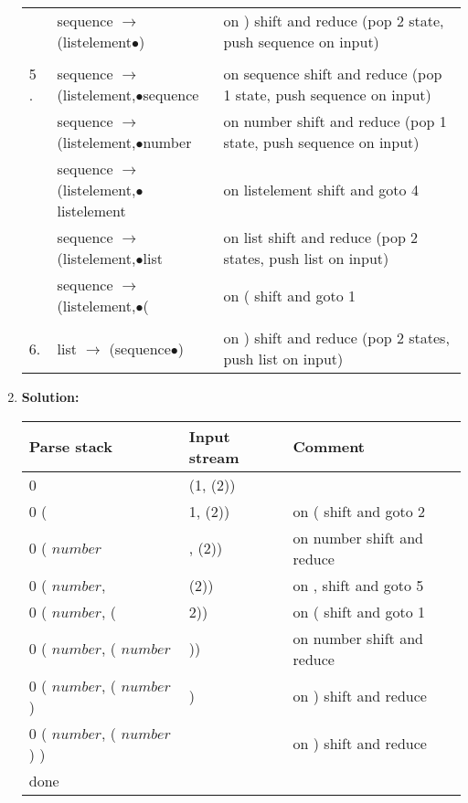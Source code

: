 \documentclass{article}
\begin{document}
\begin{enumerate}
\begin{center}
\begin{tabular}{l l l}
  &  sequence $\to$ (listelement$\bullet$)  &     on ) shift and reduce (pop 2 state, push sequence on input)\\
& & \\
5 .&  sequence $\to$ (listelement,$\bullet$sequence &  on sequence shift and reduce (pop 1 state, push sequence on input)\\
  &  sequence $\to$ (listelement,$\bullet$number   &  on number shift and reduce (pop 1 state, push sequence on input)\\
  &  sequence $\to$ (listelement,$\bullet$listelement&    on listelement shift and goto 4\\
  &  sequence $\to$ (listelement,$\bullet$list  &     on list shift and reduce (pop 2 states, push list on input)\\
  &  sequence $\to$ (listelement,$\bullet$(  &    on ( shift and goto 1\\
& & \\
6. &  list $\to$ (sequence$\bullet$)    &      on ) shift and reduce (pop 2 states, push list on input)\\
\end{tabular}
\end{center}
    \item \textbf{Solution:}
    \begin{center}
    \begin{tabular}{l l l}
Parse stack & Input stream & Comment \\
\hline
0 & (1, (2)) & \\
0 ( & 1, (2)) & on ( shift and goto 2 \\
0 ( $number$ & , (2)) & on number shift and reduce \\
0 ( $number$, & (2)) & on , shift and goto 5 \\
0 ( $number$, ( & 2)) & on ( shift and goto 1 \\
0 ( $number$, ( $number$ & )) & on number shift and reduce\\
0 ( $number$, ( $number$ ) & ) & on ) shift and reduce\\
0 ( $number$, ( $number$ ) ) & & on ) shift and reduce\\
done & & \\
\end{tabular}
\end{center}
\end{enumerate}
\end{document}
